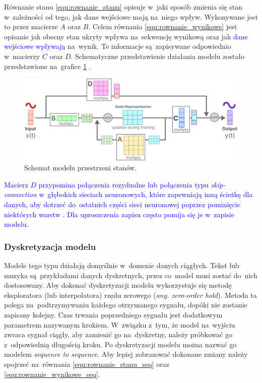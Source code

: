 \documentclass[data-science]{agh-wi} %
\begin{document}
Równanie stanu \ref*{equ:rownanie_stanu} opisuje w~jaki sposób zmienia się stan w~zależności od tego, jak dane wejściowe mają na~niego wpływ. Wykonywane jest to przez macierze $A$ oraz $B$. Celem równania \ref*{equ:rownanie_wynikowe} jest opisanie jak obecny stan ukryty wpływa na~sekwencję wynikową oraz jak \textcolor{blue}{dane wejściowe wpływają} na~wynik. Te informacje są~zapisywane odpowiednio w~macierzy $C$ oraz $D$. Schematyczne przedstawienie działania modelu zostało przedstawione na~grafice \ref*{fig:ssm_scheme} \cite*{mamba_guide}.

\begin{figure}[ht!]
    \begin{center}
        \includegraphics[width=0.9\linewidth]{./img/SSM_scheme.png}
    \end{center}
    \caption{Schemat modelu przestrzeni stanów.}\label{fig:ssm_scheme}
\end{figure}

\textcolor{blue}{Macierz $D$ przypomina połączenia rezydualne lub połączenia typu \textit{skip-connection} w~głębokich sieciach neuronowych, które zapewniają inną ścieżkę dla danych, aby dotrzeć do~ostatnich części sieci neuronowej poprzez pominięcie niektórych warstw \cite{resnet}. Dla uproszczenia zapisu często pomija się je w~zapisie modelu}.

\subsubsection*{Dyskretyzacja modelu}
Modele tego typu działają domyślnie w~domenie danych ciągłych. Tekst lub muzyka są~przykładami danych dyskretnych, przez co~model musi zostać do~nich dostosowany. Aby dokonać dyskretyzacji modelu wykorzystuje się metodę eksploratora (lub interpolatora) rzędu zerowego (\textit{ang. zero-order hold}). Metoda ta polega na~podtrzymywaniu każdego otrzymanego sygnału, dopóki nie zostanie zapisany kolejny. Czas trwania poprzedniego sygnału jest dodatkowym parametrem nazywanym krokiem. W~związku z~tym, że model na~wyjściu zwraca sygnał ciągły, aby zamienić go na~dyskretny, należy próbkować go z~odpowiednią długością kroku. Po dyskretyzacji modelu można nazwać go modelem \textit{sequence to sequence}. Aby lepiej zobrazować dokonane zmiany należy spojrzeć na~równania \ref*{equ:rownanie_stanu_seq} oraz \ref*{equ:rownanie_wynikowe_seq}.
\end{document}
